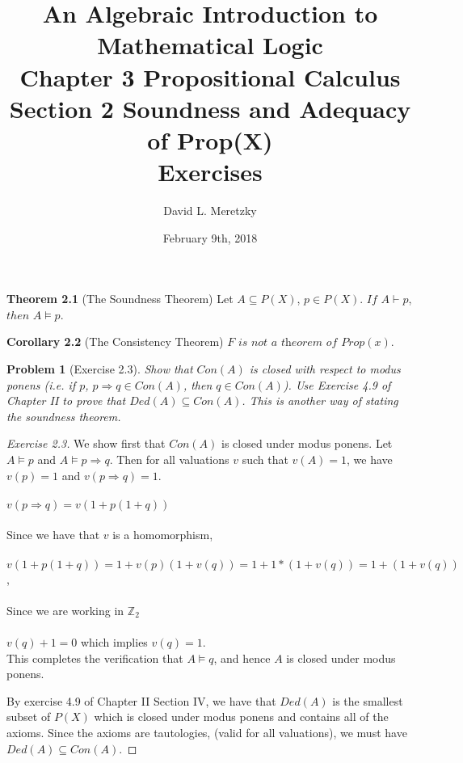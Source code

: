 \documentclass{article}
\title{ \vspace{-10ex} %
An Algebraic Introduction to Mathematical Logic\\
Chapter 3 Propositional Calculus \\
Section 2 Soundness and Adequacy of Prop(X) \\
Exercises 
}
\author{David L. Meretzky
}
\date{%
February 9th, 2018
}
\theoremstyle{problemstyle}
\newtheorem{problem}{Problem}
\begin{document}
\maketitle

\begin{flushleft}
\textbf{Theorem 2.1} (The Soundness Theorem) Let $A \subseteq P(X)$, $p \in P(X)$. $If$ $A \vdash p$, $then$ $A \models p$.
\end{flushleft}

\begin{flushleft}
\textbf{Corollary 2.2} (The Consistency Theorem) $F$ $\textit{is not a theorem of}$ $Prop(x)$.
\end{flushleft}

\begin{problem}[Exercise 2.3] 
Show that $Con(A)$ is closed with respect to modus ponens (i.e. if $p$, $p \Rightarrow q \in Con(A)$, then $q \in Con(A)$). Use Exercise 4.9 of Chapter II to prove that $Ded(A) \subseteq Con(A)$. This is another way of stating the soundness theorem. 
\end{problem}

\begin{proof}[Exercise 2.3]
We show first that $Con(A)$ is closed under modus ponens. Let $A\models p$ and $A \models p\Rightarrow q$. Then for all valuations $v$ such that $v(A) = 1$, we have $v(p)=1$ and $v(p\Rightarrow q) = 1$. \\\\
$v(p \Rightarrow q) = v(1 + p(1 + q))$\\\\
Since we have that $v$ is a homomorphism,\\\\
$v(1 + p(1 + q)) = 1 + v(p)(1 + v(q)) = 1 + 1*(1 + v(q)) = 1 + (1 + v(q))$,\\\\
Since we are working in $\mathbb{Z}_2$\\\\
$v(q)+1 = 0$ which implies $v(q) = 1$. \\

This completes the verification that $A\models q$, and hence $A$ is closed under modus ponens. 

By exercise 4.9 of Chapter II Section IV, we have that $Ded(A)$ is the smallest subset of $P(X)$ which is closed under modus ponens and contains all of the axioms. Since the axioms are tautologies, (valid for all valuations), we must have $Ded(A) \subseteq Con(A)$.
\end{proof}
\end{document}
